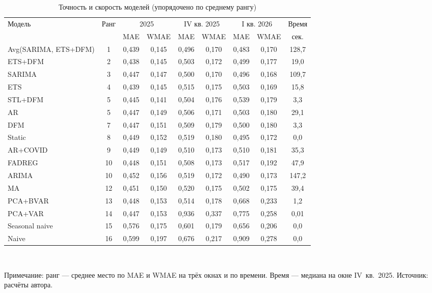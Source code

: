 \documentclass[12pt]{article}
\begin{document}
\begin{table}[htbp]
\centering
\caption{Точность и скорость моделей (упорядочено по среднему рангу)}
\label{tab:results}
\footnotesize
\setlength{\tabcolsep}{3.5pt}
\begin{tabular}{lcccccccc}
\toprule
Модель & Ранг & \multicolumn{2}{c}{2025} & \multicolumn{2}{c}{IV кв. 2025} & \multicolumn{2}{c}{I кв. 2026} & Время \\
\cmidrule(lr){3-4}\cmidrule(lr){5-6}\cmidrule(lr){7-8}
 &  & MAE & WMAE & MAE & WMAE & MAE & WMAE & сек. \\
\midrule
Avg(SARIMA, ETS+DFM) & 1 & 0{,}439 & 0{,}145 & 0{,}496 & 0{,}170 & 0{,}483 & 0{,}170 & 128{,}7 \\
ETS+DFM & 2 & 0{,}438 & 0{,}145 & 0{,}503 & 0{,}172 & 0{,}499 & 0{,}177 & 19{,}0 \\
SARIMA & 3 & 0{,}447 & 0{,}147 & 0{,}500 & 0{,}170 & 0{,}496 & 0{,}168 & 109{,}7 \\
ETS & 4 & 0{,}439 & 0{,}145 & 0{,}515 & 0{,}175 & 0{,}503 & 0{,}169 & 15{,}8 \\
STL+DFM & 5 & 0{,}445 & 0{,}141 & 0{,}504 & 0{,}176 & 0{,}539 & 0{,}179 & 3{,}3 \\
AR & 5 & 0{,}447 & 0{,}149 & 0{,}506 & 0{,}171 & 0{,}503 & 0{,}180 & 29{,}1 \\
DFM & 7 & 0{,}447 & 0{,}151 & 0{,}509 & 0{,}179 & 0{,}500 & 0{,}180 & 3{,}3 \\
Static & 8 & 0{,}449 & 0{,}152 & 0{,}519 & 0{,}180 & 0{,}495 & 0{,}172 & 0{,}0 \\
AR+COVID & 9 & 0{,}449 & 0{,}149 & 0{,}510 & 0{,}173 & 0{,}510 & 0{,}181 & 35{,}3 \\
FADREG & 10 & 0{,}448 & 0{,}151 & 0{,}508 & 0{,}173 & 0{,}517 & 0{,}192 & 47{,}9 \\
ARIMA & 10 & 0{,}452 & 0{,}156 & 0{,}519 & 0{,}172 & 0{,}490 & 0{,}173 & 147{,}2 \\
MA & 12 & 0{,}451 & 0{,}150 & 0{,}520 & 0{,}175 & 0{,}502 & 0{,}175 & 39{,}4 \\
PCA+BVAR & 13 & 0{,}448 & 0{,}153 & 0{,}514 & 0{,}178 & 0{,}668 & 0{,}233 & 1{,}2 \\
PCA+VAR & 14 & 0{,}447 & 0{,}153 & 0{,}936 & 0{,}337 & 0{,}775 & 0{,}258 & 0{,}01 \\
Seasonal naive & 15 & 0{,}576 & 0{,}175 & 0{,}601 & 0{,}179 & 0{,}656 & 0{,}206 & 0{,}0 \\
Naive & 16 & 0{,}599 & 0{,}197 & 0{,}676 & 0{,}217 & 0{,}909 & 0{,}278 & 0{,}0 \\
\bottomrule
\end{tabular}\\[4pt]
{\raggedright\footnotesize Примечание: ранг --- среднее место по MAE и WMAE на трёх окнах и по времени. Время --- медиана на окне IV~кв.~2025. Источник: расчёты автора.\par}
\end{table}
\end{document}
